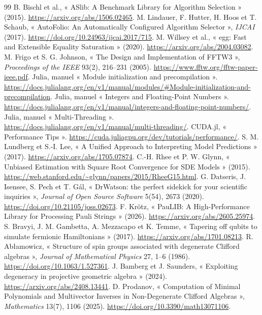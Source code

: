 \documentclass[11pt,a4paper]{article}
\begin{document}
\begin{thebibliography}{99}
 B. Bischl et al., « ASlib: A Benchmark Library for Algorithm Selection » (2015). \url{https://arxiv.org/abs/1506.02465}.
 M. Lindauer, F. Hutter, H. Hoos et T. Schaub, « AutoFolio: An Automatically Configured Algorithm Selector », \emph{IJCAI} (2017). \url{https://doi.org/10.24963/ijcai.2017/715}.
 M. Willsey et al., « egg: Fast and Extensible Equality Saturation » (2020). \url{https://arxiv.org/abs/2004.03082}.
 M. Frigo et S. G. Johnson, « The Design and Implementation of FFTW3 », \emph{Proceedings of the IEEE} 93(2), 216--231 (2005). \url{https://www.fftw.org/fftw-paper-ieee.pdf}.
 Julia, manuel « Module initialization and precompilation ». \url{https://docs.julialang.org/en/v1/manual/modules/#Module-initialization-and-precompilation}.
 Julia, manuel « Integers and Floating-Point Numbers ». \url{https://docs.julialang.org/en/v1/manual/integers-and-floating-point-numbers/}.
 Julia, manuel « Multi-Threading ». \url{https://docs.julialang.org/en/v1/manual/multi-threading/}.
 CUDA.jl, « Performance Tips ». \url{https://cuda.juliagpu.org/dev/tutorials/performance/}.
 S. M. Lundberg et S.-I. Lee, « A Unified Approach to Interpreting Model Predictions » (2017). \url{https://arxiv.org/abs/1705.07874}.
 C.-H. Rhee et P. W. Glynn, « Unbiased Estimation with Square Root Convergence for SDE Models » (2015). \url{https://web.stanford.edu/~glynn/papers/2015/RheeG15.html}.
 G. Datseris, J. Isensee, S. Pech et T. Gál, « DrWatson: the perfect sidekick for your scientific inquiries », \emph{Journal of Open Source Software} 5(54), 2673 (2020). \url{https://doi.org/10.21105/joss.02673}.
 F. Krötz, « PauLIB: A High-Performance Library for Processing Pauli Strings » (2026). \url{https://arxiv.org/abs/2605.25974}.
 S. Bravyi, J. M. Gambetta, A. Mezzacapo et K. Temme, « Tapering off qubits to simulate fermionic Hamiltonians » (2017). \url{https://arxiv.org/abs/1701.08213}.
 R. Abłamowicz, « Structure of spin groups associated with degenerate Clifford algebras », \emph{Journal of Mathematical Physics} 27, 1--6 (1986). \url{https://doi.org/10.1063/1.527361}.
 J. Bamberg et J. Saunders, « Exploiting degeneracy in projective geometric algebra » (2024). \url{https://arxiv.org/abs/2408.13441}.
 D. Prodanov, « Computation of Minimal Polynomials and Multivector Inverses in Non-Degenerate Clifford Algebras », \emph{Mathematics} 13(7), 1106 (2025). \url{https://doi.org/10.3390/math13071106}.

\end{thebibliography}
\end{document}
